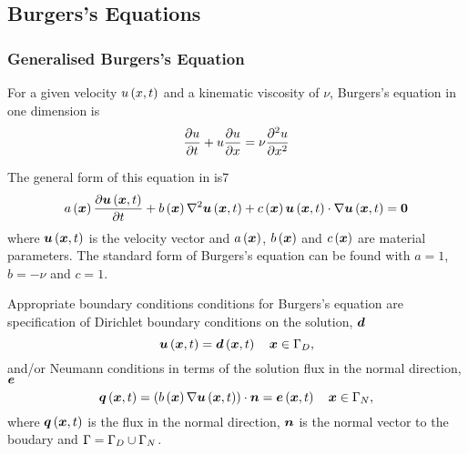 \subsection{Burgers's Equations}

\subsubsection{Generalised Burgers's Equation}


For a given velocity $ u\left( x,t \right) $ and a kinematic viscosity of $\nu$, Burgers's equation
in one dimension is
\begin{equation}
  \delby{u}{t}+u\delby{u}{x}=\nu\deltwosqby{u}{x}
  \label{eqn:Burgersequation}
\end{equation}

The general form of this equation in \OpenCMISS is7
\begin{equation}
  \fnof{a}{\vectr{x}}\delby{\fnof{\vectr{u}}{\vectr{x},t}}{t}+\fnof{b}{\vectr{x}}\laplacian{}{\fnof{\vectr{u}}{\vectr{x},t}}+
  \fnof{c}{\vectr{x}}\dotprod{\fnof{\vectr{u}}{\vectr{x},t}}{\gradient{}{\fnof{\vectr{u}}{\vectr{x},t}}}=\vectr{0}
  \label{eqn:GeneralFormBurgersequation}
\end{equation}
where $ \boldsymbol{u}\left( \boldsymbol{x},t \right) $ is the velocity vector and
$ a\left( \boldsymbol{x} \right) $, $ b\left( \boldsymbol{x} \right) $ and $ c\left( \boldsymbol{x} \right) $ are
material parameters. The standard form of Burgers's equation can be found with
$a=1$, $b=-\nu$ and $c=1$.

Appropriate boundary conditions conditions for Burgers's
equation are specification of Dirichlet boundary conditions on the solution,
$\boldsymbol{d}$ \ie
\begin{equation}
  \fnof{\vectr{u}}{\vectr{x},t} = \fnof{\vectr{d}}{\vectr{x},t} \quad \vectr{x}\in\Gamma_{D},
  \label{eqn:BurgersDirichletBC} 
\end{equation}
and/or Neumann conditions in terms of the solution flux in the normal
direction, $\boldsymbol{e}$ \ie
\begin{equation}
  \fnof{\vectr{q}}{\vectr{x},t} = \dotprod{\pbrac{\fnof{b}{\vectr{x}}
      \gradient{}{\fnof{\vectr{u}}{\vectr{x},t}}}}{\normal} =
  \fnof{\vectr{e}}{\vectr{x},t} \quad \vectr{x}\in\Gamma_{N},
  \label{eqn:BurgersNeumannBC} 
\end{equation}
where $ \boldsymbol{q}\left( \boldsymbol{x},t \right) $ is the flux in the normal direction, $\boldsymbol{n}$ is the normal
vector to the boudary and $\Gamma=\Gamma_{D}\cup\Gamma_{N}$.

